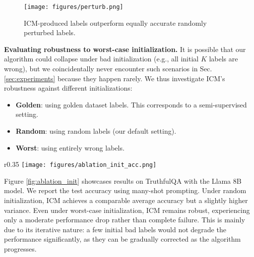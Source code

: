 \documentclass{article}
\newcommand{\ourmethod}[0]{\textsc{ICM}\xspace}
\begin{document}
\begin{figure}[h]
    \centering
    \texttt{[image: figures/perturb.png]}
    \caption{\ourmethod-produced labels outperform equally accurate randomly perturbed labels.}
    \label{fig:perturb}
\end{figure}




\textbf{Evaluating robustness to worst-case initialization.} It is possible that our algorithm could collapse under bad initialization (e.g., all initial $K$ labels are wrong), but we coincidentally never encounter such scenarios in Sec. \ref{sec:experiments} because they happen rarely. We thus investigate \ourmethod's robustness against different initializations: 
\begin{itemize}[leftmargin=*, topsep=-2pt, itemsep=-2pt]
    \item \textbf{Golden}: using golden dataset labels. This corresponds to a semi-supervised setting.
    \item \textbf{Random}: using random labels (our default setting).
    \item \textbf{Worst}: using entirely wrong labels.
\end{itemize}

\begin{wrapfigure}{r}{0.35\linewidth}
    \centering
    \vspace{-15mm}
    \texttt{[image: figures/ablation\_init\_acc.png]}
    \caption{Impact of initialization.}
    \vspace{-5mm}
    \label{fig:ablation_init}
\end{wrapfigure}
Figure \ref{fig:ablation_init} showcases results on TruthfulQA with the Llama 8B model. We report the test accuracy using many-shot prompting.  Under random initialization, \ourmethod achieves a comparable average accuracy but a slightly higher variance. Even under worst-case initialization, \ourmethod remains robust, experiencing only a moderate performance drop rather than complete failure. This is mainly due to its iterative nature: a few initial bad labels would not degrade the performance significantly, as they can be gradually corrected as the algorithm progresses.
\end{document}
